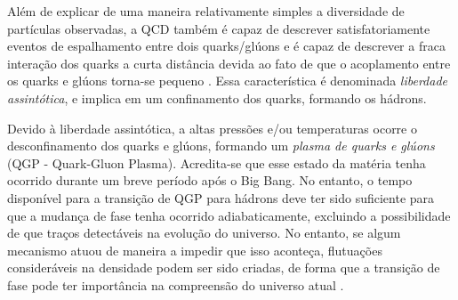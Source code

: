 


Além de explicar de uma maneira relativamente simples a diversidade de partículas observadas, a QCD também é capaz de descrever satisfatoriamente eventos de espalhamento entre dois quarks/glúons e é capaz de descrever a fraca interação dos quarks a curta distância devida ao fato de que o acoplamento entre os quarks e glúons torna-se pequeno \parencite{GreinerQCDBook, Gross, Klevansky}. Essa característica é denominada \emph{liberdade assintótica}, e implica em um confinamento dos quarks, formando os hádrons.

Devido à liberdade assintótica, a altas pressões e/ou temperaturas ocorre o desconfinamento dos quarks e glúons, formando um \emph{plasma de quarks e glúons} (QGP - Quark-Gluon Plasma). Acredita-se que esse estado da matéria tenha ocorrido durante um breve período após o Big Bang. No entanto, o tempo disponível para a transição de QGP para hádrons deve ter sido suficiente para que a mudança de fase tenha ocorrido adiabaticamente, excluindo a possibilidade de que traços detectáveis na evolução do universo. No entanto, se algum mecanismo atuou de maneira a impedir que isso aconteça, flutuações consideráveis na densidade podem ser sido criadas, de forma que a transição de fase pode ter importância na compreensão do universo atual \parencite{Mueller}.

